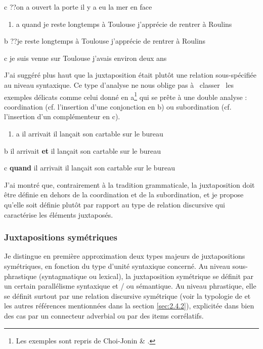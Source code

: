   c  ??on a ouvert la porte il y a eu la mer en face


\begin{enumerate}
\item \label{bkm:Ref273721388}a  quand je reste longtemps à Toulouse j'apprécie de rentrer à Roulins


\end{enumerate}
  b  ??je reste longtemps à Toulouse j'apprécie de rentrer à Roulins

  c  je suis venue sur Toulouse j'avais environ deux ans

J'ai suggéré plus haut que la juxtaposition était plutôt une relation sous-spécifiée au niveau syntaxique. Ce type d'analyse ne nous oblige pas à {\guillemotleft}~classer~{\guillemotright} les exemples délicats comme celui donné en a\footnote{Les exemples sont repris de Choi-Jonin \& \citet[88]{Roussarie2006}.} qui se prête à une double analyse : coordination (cf. l'insertion d'une conjonction en b) ou subordination (cf. l'insertion d'un complémenteur en c). 


\begin{enumerate}
\item \label{bkm:Ref273722739}a  il arrivait il lançait son cartable sur le bureau


\end{enumerate}
  b  il arrivait \textbf{et} il lançait son cartable sur le bureau

  c  \textbf{quand} il arrivait il lançait son cartable sur le bureau

J'ai montré que, contrairement à la tradition grammaticale, la juxtaposition doit être définie en dehors de la coordination et de la subordination, et je propose qu'elle soit définie plutôt par rapport au type de relation discursive qui caractérise les éléments juxtaposés. 

\subsubsection{Juxtapositions symétriques}
Je distingue en première approximation deux types majeurs de juxtapositions symétriques, en fonction du type d'unité syntaxique concerné. Au niveau sous-phrastique (syntagmatique ou lexical), la juxtaposition symétrique se définit par un certain parallélisme syntaxique et / ou sémantique. Au niveau phrastique, elle se définit surtout par une relation discursive symétrique (voir la typologie de \citet{Kehler2002} et les autres références mentionnées dans la section \ref{sec:2.4.2}), explicitée dans bien des cas par un connecteur adverbial ou par des items corrélatifs. 

